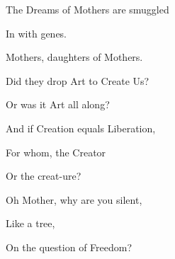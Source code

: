 \documentclass{article}
\begin{document}
\newline

The Dreams of Mothers are smuggled 
\newline

In with genes.
\newline

Mothers, daughters of Mothers.
\newline

Did they drop Art to Create Us?
\newline

Or was it Art all along?
\newline

And if Creation equals Liberation,
\newline

For whom, the Creator 
\newline

Or the creat-ure?
\newline

Oh Mother, why are you silent,
\newline

Like a tree, 
\newline

On the question of Freedom?
\newline
\end{document}
